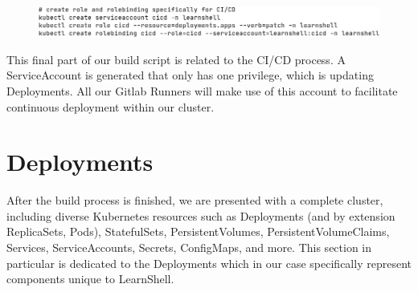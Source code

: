 \documentclass[thesis=B,english]{FITthesis}[2019/12/23]
\begin{document}
\begin{figure}[H]
\centering
\hspace*{-0.5cm}
\includegraphics[scale=0.5]{build-kube3}
\end{figure}

This final part of our build script is related to the CI/CD process. A ServiceAccount is generated that only has one privilege, which is updating Deployments. All our Gitlab Runners will make use of this account to facilitate continuous deployment within our cluster.

\section{Deployments}

After the build process is finished, we are presented with a complete cluster, including diverse Kubernetes resources such as Deployments (and by extension ReplicaSets, Pods), StatefulSets, PersistentVolumes, PersistentVolumeClaims, Services, ServiceAccounts, Secrets, ConfigMaps, and more. This section in particular is dedicated to the Deployments which in our case specifically represent components unique to LearnShell.
\end{document}
